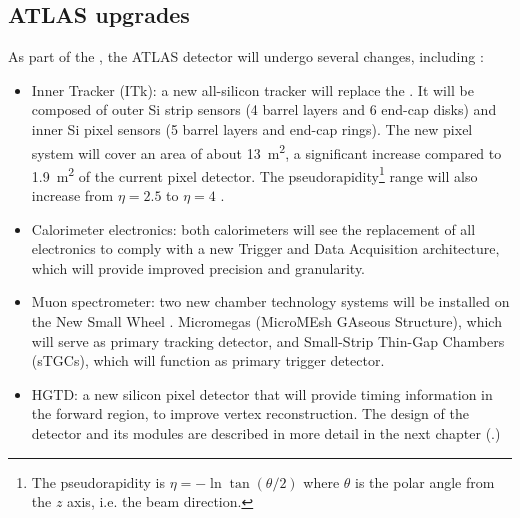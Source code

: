 \subsection{ATLAS upgrades}\label{subsec:ATLAS_upgrades}

As part of the , the ATLAS detector will undergo several changes, including \cite{MANGHI2024169917}: %

\begin{itemize}
    \item Inner Tracker (ITk): a new all-silicon tracker will replace the . It will be composed of outer Si strip sensors (4 barrel layers and 6 end-cap disks) and inner Si pixel sensors (5 barrel layers and end-cap rings). The new pixel system will cover an area of about \qty{13}{\meter^2}, a significant increase compared to \qty{1.9}{\meter^2} of the current pixel detector. The pseudorapidity\footnote{The pseudorapidity is \(\eta=-\ln \tan(\theta/2)\) where \(\theta\) is the polar angle from the \(z\) axis, i.e. the beam direction.} range will also increase from \(\eta=2.5\) to \(\eta=4\) \cite{Buttar:2024imj}.
    \item Calorimeter electronics: both calorimeters will see the replacement of all electronics to comply with a new Trigger and Data Acquisition architecture, which will provide improved precision and granularity. 
    \item Muon spectrometer: two new chamber technology systems \cite{2106380} will be installed on the New Small Wheel \cite{Kawamoto:2013udg}. Micromegas (MicroMEsh GAseous Structure), which will serve as primary tracking detector, and Small-Strip Thin-Gap Chambers (sTGCs), which will function as primary trigger detector.
    \item HGTD: a new silicon pixel detector that will provide timing information in the forward region, to improve vertex reconstruction. The design of the detector and its modules are described in more detail in the next chapter (.)
\end{itemize}

